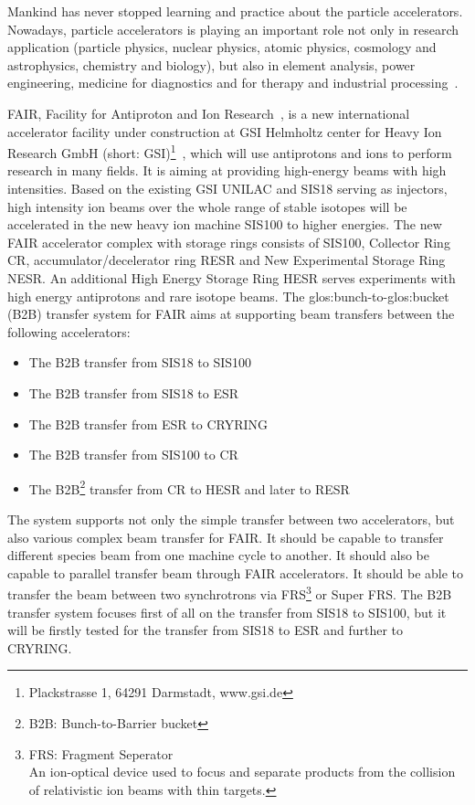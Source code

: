 Mankind has never stopped learning and practice about the particle accelerators. Nowadays, particle accelerators is playing an important role not only in research application (particle physics, nuclear physics, atomic physics, cosmology and astrophysics, chemistry and biology), but also in element analysis, power engineering, medicine for diagnostics and for therapy and industrial processing~\cite{barbalat_applications_1994}. 


FAIR, Facility for Antiproton and Ion Research~\cite{_fair_2011}, is a new international accelerator facility under construction at GSI Helmholtz center for Heavy Ion Research GmbH (short: GSI)\footnote{Plackstrasse 1, 64291 Darmstadt, www.gsi.de}~\cite{_gsi_2011}, which will use antiprotons and ions to perform research in many fields. It is aiming at providing high-energy beams with high intensities. Based on the existing GSI UNILAC and SIS18 serving as injectors, high intensity ion beams over the whole range of stable isotopes will be accelerated in the new heavy ion machine SIS100 to higher energies. The new FAIR accelerator complex with storage rings consists of SIS100, Collector Ring CR, accumulator/decelerator ring RESR and New Experimental Storage Ring NESR. An additional High Energy Storage Ring HESR serves experiments with high energy antiprotons and rare isotope beams. The \gls{glos:bunch}-to-\gls{glos:bucket} (\gls{B2B}) transfer system for FAIR aims at supporting beam transfers between the following accelerators:
\begin{itemize}
\item The B2B transfer from SIS18 to SIS100
\item The B2B transfer from SIS18 to ESR
\item The B2B transfer from ESR to CRYRING
\item The B2B transfer from SIS100 to CR
\item The B2B\footnote{B2B: Bunch-to-Barrier bucket} transfer from CR to HESR and later to RESR
\end{itemize}

The system supports not only the simple transfer between two accelerators, but also various complex beam transfer for FAIR. It should be capable to transfer different species beam from one machine cycle to another. It should also be capable to parallel transfer beam through FAIR accelerators. It should be able to transfer the beam between two synchrotrons via FRS\footnote{FRS: Fragment Seperator \\An ion-optical device used to focus and separate products from the collision of relativistic ion beams with thin targets.} or Super FRS. The B2B transfer system focuses first of all on the transfer from SIS18 to SIS100, but it will be firstly tested for the transfer from SIS18 to ESR and further to CRYRING.  

